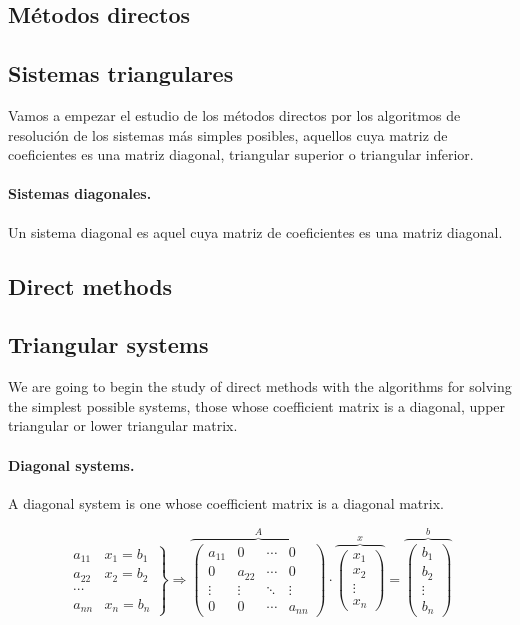 \begin{paracol}{2}
\section{Métodos directos}
\subsection{Sistemas triangulares}
Vamos a empezar el estudio de los métodos directos por los algoritmos de resolución de los sistemas más simples posibles, aquellos cuya matriz de coeficientes es una matriz diagonal, triangular superior o triangular inferior.
\paragraph{Sistemas diagonales.} Un sistema diagonal es aquel cuya matriz de coeficientes es una matriz diagonal. 

\switchcolumn

\subsection{Direct methods}
\subsection{Triangular systems}
We are going to begin the study of direct methods with the algorithms for solving the simplest possible systems, those whose coefficient matrix is a diagonal, upper triangular or lower triangular matrix.
\paragraph{ Diagonal systems.} A diagonal system is one whose coefficient matrix is a diagonal matrix. 
\end{paracol}

\begin{equation*}
\left. \begin{aligned}
a_{11}&x_1=b_1\\
a_{22}&x_2=b_2\\
\cdots & \\
a_{nn}&x_n=b_n
\end{aligned}\right\} \Rightarrow	\overbrace{\begin{pmatrix}
a_{11}& 0& \cdots & 0\\
0& a_{22}& \cdots & 0\\
\vdots & \vdots & \ddots & \vdots\\
0& 0& \cdots & a_{nn}
\end{pmatrix}}^A \cdot \overbrace{\begin{pmatrix}
x_1\\
x_2\\
\vdots \\
x_n
\end{pmatrix}}^x=\overbrace{\begin{pmatrix}
b_1\\
b_2\\
\vdots \\
b_n
\end{pmatrix}}^b
\end{equation*}

